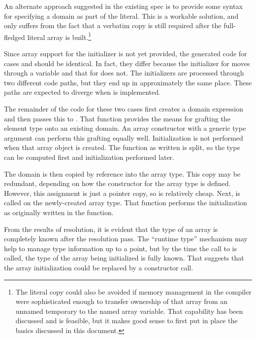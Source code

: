 An alternate approach suggested in
the existing spec is to provide some syntax for specifying a domain as part of the literal.  
This is a workable solution, and only suffers from the fact that a verbatim copy is still
required after the full-fledged literal array is built.\footnote{The literal copy could also
  be avoided if memory management in the compiler were sophisticated enough to transfer
  ownership of that array from an unnamed temporary to the named array variable.  That
  capability has been discussed and is feasible, but it makes good sense to first put
  in place the basics discussed in this document.}

Since array support for the  initializer is not yet provided, the generated code for
cases  and  should be identical.  In fact, they differ because the
initializer for  moves through a  variable and that for 
does not.  The initializers are processed through two different code paths, but they end
up in approximately the same place.  These paths are expected to diverge when 
is implemented.

The remainder of the code for these two cases first creates a domain expression and then
passes this to .  That function provides the
means for grafting the element type onto an existing domain.  An array constructor with a
generic type argument can perform this grafting equally well.  Initialization is not
performed when that array object is created.  The function as written is split, so the
type can be computed first and initialization performed later.

The domain is then copied by reference into the array type.  This copy may be redundant,
depending on how the constructor for the array type is defined.  However, this
assignment is just a pointer copy, so is relatively cheap.  Next,
 is called on the newly-created array type.  That
function performs the initialization as originally written in the 
function.

From the results of resolution, it is evident that the type of an array is completely
known after the resolution pass.  The ``runtime type'' mechanism may help to manage type
information up to a point, but by the time the call to
 is called, the type of the array being initialized
is fully known.  That suggests that the array initialization could be replaced by a
constructor call.


